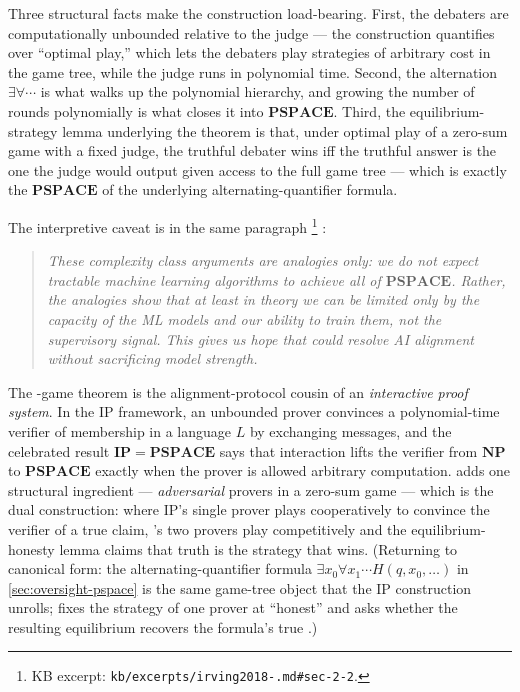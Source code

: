 Three structural facts make the construction load-bearing. First, the
debaters are computationally unbounded relative to the judge --- the
construction quantifies over ``optimal play,'' which lets the debaters
play strategies of arbitrary cost in the game tree, while the judge
runs in polynomial time. Second, the alternation $\exists \forall
\cdots$ is what walks up the polynomial hierarchy, and growing the
number of rounds polynomially is what closes it into $\mathbf{PSPACE}$.
Third, the equilibrium-strategy lemma underlying the theorem is that,
under optimal play of a zero-sum game with a fixed judge, the truthful
debater wins iff the truthful answer is the one the judge would output
given access to the full game tree --- which is exactly the
$\mathbf{PSPACE}$  of the underlying alternating-quantifier
formula.

The interpretive caveat is in the same paragraph%
\footnote{KB excerpt: \texttt{kb/excerpts/irving2018-.md\#sec-2-2}.}
\citep[\S 2.2]{irving2018-debate}:

\begin{quote}\itshape
These complexity class arguments are analogies only: we do not expect
tractable machine learning algorithms to achieve all of $\mathbf{PSPACE}$.
Rather, the analogies show that at least in theory we can be limited
only by the capacity of the ML models and our ability to train them,
not the supervisory signal. This gives us hope that  could
resolve AI alignment without sacrificing model strength.
\end{quote}

\begin{analogy}
The -game theorem is the alignment-protocol cousin of an
\emph{interactive proof system}. In the IP framework, an unbounded
prover convinces a polynomial-time verifier of membership in a
language $L$ by exchanging messages, and the celebrated result
$\mathbf{IP} = \mathbf{PSPACE}$  says that interaction lifts the verifier from
$\mathbf{NP}$ to $\mathbf{PSPACE}$ exactly when the prover is allowed
arbitrary computation.  adds one structural ingredient ---
\emph{adversarial} provers in a zero-sum game --- which is the dual
construction: where IP's single prover plays cooperatively to convince
the verifier of a true claim, 's two provers play competitively
and the equilibrium-honesty lemma claims that truth is the strategy
that wins. (Returning to canonical form: the alternating-quantifier
formula $\exists x_0 \forall x_1 \cdots H(q, x_0, \ldots)$ in
\cref{sec:oversight-pspace} is the same game-tree object that the IP
construction unrolls;  fixes the strategy of one prover at
``honest'' and asks whether the resulting equilibrium recovers the
formula's true .)
\end{analogy}

